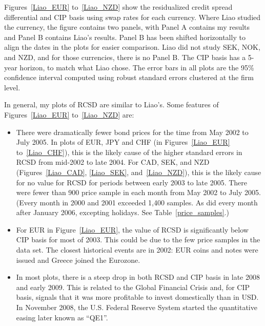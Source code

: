 Figures~\ref{Liao_EUR} to~\ref{Liao_NZD} show the residualized credit spread differential and CIP basis using swap rates for each currency.  Where Liao studied the currency, the figure contains two panels, with Panel A contains my results and Panel B contains Liao's results.  Panel B has been shifted horizontally to align the dates in the plots for easier comparison.  Liao did not study SEK, NOK, and NZD, and for those currencies, there is no Panel B.  The CIP basis has a 5-year horizon, to match what Liao chose.  The error bars in all plots are the 95\% confidence interval computed using robust standard errors clustered at the firm level.

In general, my plots of RCSD are similar to Liao's.  Some features of Figures~\ref{Liao_EUR} to~\ref{Liao_NZD} are:
\begin{itemize}

\item There were dramatically fewer bond prices for the time from May 2002 to July 2005.  In plots of EUR, JPY and CHF (in Figures~\ref{Liao_EUR} to~\ref{Liao_CHF}), this is the likely cause of the higher standard errors in RCSD from mid-2002 to late 2004.  For CAD, SEK, and NZD (Figures~\ref{Liao_CAD}, \ref{Liao_SEK}, and~\ref{Liao_NZD}), this is the likely cause for no value for RCSD for periods between early 2003 to late 2005.
There were fewer than 900 price sample in each month from May 2002 to July 2005.  (Every month in 2000 and 2001 exceeded 1,400 samples.  As did every month after January 2006, excepting holidays.  See Table~\ref{price_samples}.)  




\item For EUR in Figure~\ref{Liao_EUR}, the value of RCSD is significantly below CIP basis for most of 2003.  This could be due to the few price samples in the data set.  The closest historical events are in 2002: EUR coins and notes were issued and Greece joined the Eurozone.  

\item In most plots, there is a steep drop in both RCSD and CIP basis in late 2008 and early 2009.  This is related to the Global Financial Crisis and, for CIP basis, signals that it was more profitable to invest domestically than in USD.  In November 2008, the U.S. Federal Reserve System started the quantitative easing later known as ``QE1''.  


\end{itemize}
